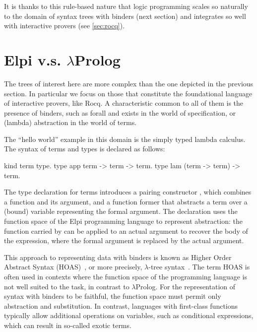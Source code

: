 \documentclass{these-ISSS}
\newenvironment{elpicode}
  {\VerbatimEnvironment\begin{elpibox}\begin{xelpicode}}{\end{xelpicode}
\end{elpibox}}
\begin{document}
It is thanks to this rule-based nature that logic programming scales so
naturally to the domain of syntax trees with binders (next section) and
integrates so well with interactive provers (see \cref{sec:rocq}).

\section{Elpi v.s. $\lambda$Prolog}\label{sec:hello}


The trees of interest here are more complex than the one
depicted in the previous section. In particular we focus on those that
constitute the foundational language of interactive provers, like Rocq.
A characteristic common to all of
them is the presence of binders, such as forall and exists in the world of
specification, or (lambda) abstraction in the world of terms.

The ``hello world'' example in this domain is the simply typed lambda
calculus. %
The syntax of terms and types is declared as follows:

\begin{elpicode}
kind term type.
type app term -> term -> term.
type lam (term -> term) -> term.
\end{elpicode}

The type declaration for terms introduces a pairing constructor ,
which combines a function and its argument, and a function former 
that abstracts a term over a (bound) variable representing the formal
argument. The declaration uses the function space of the Elpi programming language
to represent abstraction: the function carried by  can be applied to
an actual argument to recover the body of the expression, where the formal
argument is replaced by the actual argument. 

This approach to representing data with binders is known as Higher Order
Abstract Syntax (HOAS)~\cite{10.1145/960116.54010}, or more precisely,
$\lambda$-tree syntax~\cite{Miller2018MechanizedMR}. The term HOAS is often
used in contexts where the function space of the programming language is not
well suited to the task, in contrast to $\lambda$Prolog. For the representation
of syntax with binders to be faithful, the function space must permit only
abstraction and substitution. In contrast, languages with first-class
functions typically allow
additional operations on variables, such as conditional expressions, which can result
in so-called exotic terms.
\end{document}
